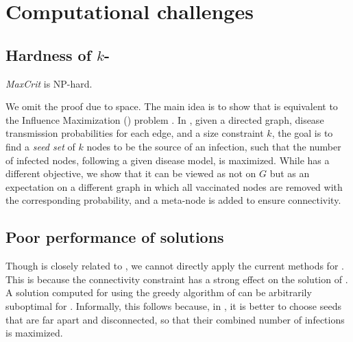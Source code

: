 

\section{Computational challenges}
\label{sec:computational-challenges}

\subsection{Hardness of $k$-\maxcrit{}}

\begin{theorem}
\label{theorem:nphard}
\emph{MaxCrit} is NP-hard.
\end{theorem}

We omit the proof due to space. The main idea is to show that \maxcrit{} is equivalent to the Influence Maximization (\infmax) problem \cite{kempe:sigkdd03}. In \infmax, given a directed graph, disease transmission probabilities for each edge, and a size constraint $k$, the goal is to find a \emph{seed set} of $k$ nodes to be the source of an infection, such that the number of infected nodes, following a given disease model, is maximized. 
While \maxcrit{} has a different objective, we show that it can be viewed as \infmax{} not on $G$ but as an expectation on a
different graph in which all vaccinated nodes are removed with the corresponding probability,
and a meta-node is added to ensure connectivity. 


\subsection{Poor performance of \infmax{} solutions}

Though \maxcrit{} is closely related to \infmax, we cannot directly apply the current methods for 
\infmax{}. This is because the connectivity constraint has a strong effect on the solution of \maxcrit{}. A solution computed for \infmax{} using the greedy algorithm of \cite{kempe:sigkdd03} can be arbitrarily suboptimal for \maxcrit{}. Informally, this follows because, in \infmax{}, it is better to choose seeds that are far apart and disconnected, so that their combined number of infections is maximized.

